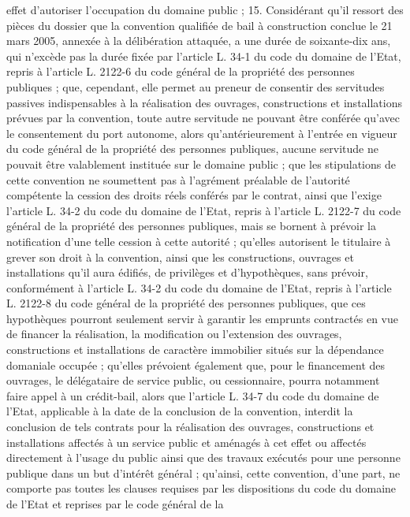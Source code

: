 \documentclass[11pt,a4paper]{report}
\begin{document}
effet d'autoriser l'occupation du domaine public ;
15. Considérant qu'il ressort des pièces du dossier que la convention qualifiée de bail à construction conclue le
21 mars 2005, annexée à la délibération attaquée, a une durée de soixante-dix ans, qui n'excède pas la durée
fixée par l'article L. 34-1 du code du domaine de l'Etat, repris à l'article L. 2122-6 du code général de la
propriété des personnes publiques ; que, cependant, elle permet au preneur de consentir des servitudes passives
indispensables à la réalisation des ouvrages, constructions et installations prévues par la convention, toute autre
servitude ne pouvant être conférée qu'avec le consentement du port autonome, alors qu'antérieurement à l'entrée
en vigueur du code général de la propriété des personnes publiques, aucune servitude ne pouvait être
valablement instituée sur le domaine public ; que les stipulations de cette convention ne soumettent pas à
l'agrément préalable de l'autorité compétente la cession des droits réels conférés par le contrat, ainsi que l'exige
l'article L. 34-2 du code du domaine de l'Etat, repris à l'article L. 2122-7 du code général de la propriété des
personnes publiques, mais se bornent à prévoir la notification d'une telle cession à cette autorité ; qu'elles
autorisent le titulaire à grever son droit à la convention, ainsi que les constructions, ouvrages et installations
qu'il aura édifiés, de privilèges et d'hypothèques, sans prévoir, conformément à l'article L. 34-2 du code du
domaine de l'Etat, repris à l'article L. 2122-8 du code général de la propriété des personnes publiques, que ces
hypothèques pourront seulement servir à garantir les emprunts contractés en vue de financer la réalisation, la
modification ou l'extension des ouvrages, constructions et installations de caractère immobilier situés sur la
dépendance domaniale occupée ; qu'elles prévoient également que, pour le financement des ouvrages, le
délégataire de service public, ou cessionnaire, pourra notamment faire appel à un crédit-bail, alors que l'article
L. 34-7 du code du domaine de l'Etat, applicable à la date de la conclusion de la convention, interdit la
conclusion de tels contrats pour la réalisation des ouvrages, constructions et installations affectés à un service
public et aménagés à cet effet ou affectés directement à l'usage du public ainsi que des travaux exécutés pour
une personne publique dans un but d'intérêt général ; qu'ainsi, cette convention, d'une part, ne comporte pas
toutes les clauses requises par les dispositions du code du domaine de l'Etat et reprises par le code général de la
\end{document}
